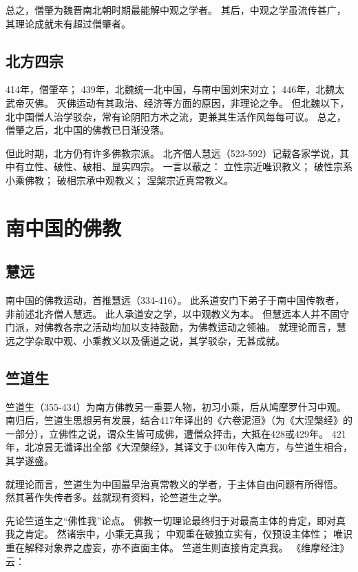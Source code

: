 \documentclass[11pt]{article}
\begin{document}
\newline

总之，僧肇为魏晋南北朝时期最能解中观之学者。
其后，中观之学虽流传甚广，其理论成就未有超过僧肇者。

\subsection{北方四宗}
414年，僧肇卒；
439年，北魏统一北中国，与南中国刘宋对立；
446年，北魏太武帝灭佛。
灭佛运动有其政治、经济等方面的原因，非理论之争。
但北魏以下，北中国僧人治学驳杂，常有论阴阳方术之流，更兼其生活作风每每可议。
总之，僧肇之后，北中国的佛教已日渐没落。

\newline

但此时期，北方仍有许多佛教宗派。
北齐僧人慧远（523-592）记载各家学说，其中有立性、破性、破相、显实四宗。
一言以蔽之：
立性宗近唯识教义；
破性宗系小乘佛教；
破相宗承中观教义；
涅槃宗近真常教义。

\section{南中国的佛教}
\subsection{慧远}
南中国的佛教运动，首推慧远（334-416）。
此系道安门下弟子于南中国传教者，非前述北齐僧人慧远。
此人承道安之学，以中观教义为本。
但慧远本人并不固守门派，对佛教各宗之活动均加以支持鼓励，为佛教运动之领袖。
就理论而言，慧远之学杂取中观、小乘教义以及儒道之说，其学驳杂，无甚成就。

\subsection{竺道生}
竺道生（355-434）为南方佛教另一重要人物，初习小乘，后从鸠摩罗什习中观。
南归后，竺道生思想另有发展，结合417年译出的《六卷泥洹》（为《大涅槃经》的一部分），立佛性之说，谓众生皆可成佛，遭僧众抨击，大抵在428或429年。
421年，北凉昙无谶译出全部《大涅槃经》，其译文于430年传入南方，与竺道生相合，其学遂盛。

\newline

就理论而言，竺道生为中国最早治真常教义的学者，于主体自由问题有所得悟。
然其著作失传者多。兹就现有资料，论竺道生之学。

\newline

先论竺道生之“佛性我”论点。
佛教一切理论最终归于对最高主体的肯定，即对真我之肯定。
然诸宗中，小乘无真我；
中观重在破独立实有，仅预设主体性；
唯识重在解释对象界之虚妄，亦不直面主体。
竺道生则直接肯定真我。
《维摩经注》云：
\end{document}

